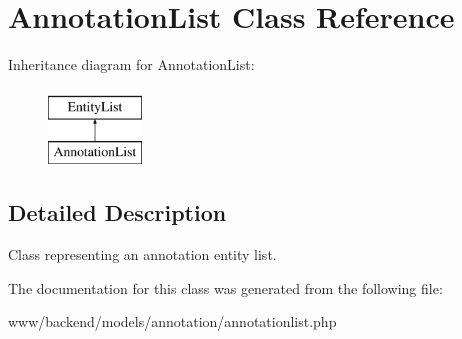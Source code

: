 \hypertarget{classAnnotationList}{
\section{AnnotationList Class Reference}
\label{classAnnotationList}
}
Inheritance diagram for AnnotationList:\begin{figure}[H]
\begin{center}
\leavevmode
\includegraphics[height=2.000000cm]{classAnnotationList}
\end{center}
\end{figure}


\subsection{Detailed Description}
Class representing an annotation entity list. 

The documentation for this class was generated from the following file:\begin{DoxyCompactItemize}
\item 
www/backend/models/annotation/annotationlist.php\end{DoxyCompactItemize}

